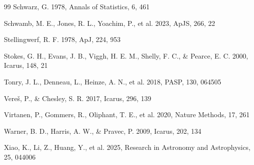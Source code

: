 \documentclass[referee]{raa}
\begin{document}
\begin{thebibliography}{99}
Schwarz, G. 1978, Annals of Statistics, 6, 461

Schwamb, M. E., Jones, R. L., Yoachim, P., et al. 2023, ApJS, 266, 22

Stellingwerf, R. F. 1978, ApJ, 224, 953

Stokes, G. H., Evans, J. B., Viggh, H. E. M., Shelly, F. C., \& Pearce, E. C. 2000, Icarus, 148, 21

Tonry, J. L., Denneau, L., Heinze, A. N., et al. 2018, PASP, 130, 064505

Vere\v{s}, P., \& Chesley, S. R. 2017, Icarus, 296, 139

Virtanen, P., Gommers, R., Oliphant, T. E., et al. 2020, Nature Methods, 17, 261

Warner, B. D., Harris, A. W., \& Pravec, P. 2009, Icarus, 202, 134

Xiao, K., Li, Z., Huang, Y., et al. 2025, Research in Astronomy and Astrophysics, 25, 044006

\end{thebibliography}
\end{document}
